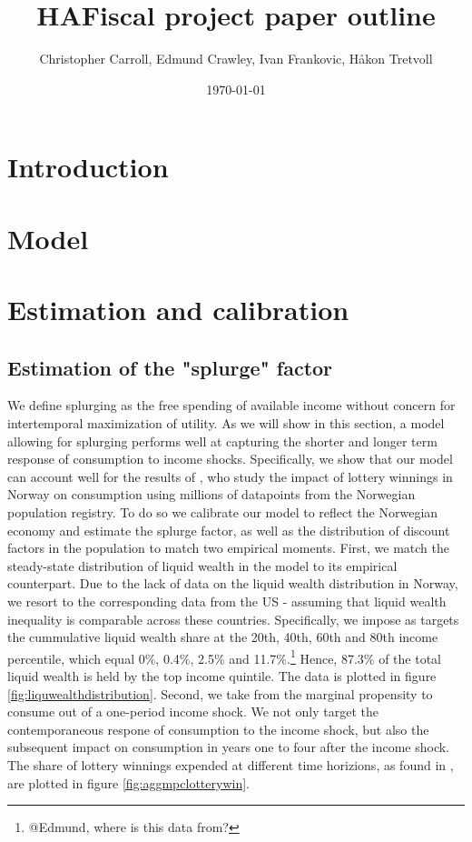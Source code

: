\documentclass[11pt]{article}
\title{ HAFiscal project paper outline}
\author{Christopher Carroll, Edmund Crawley, Ivan Frankovic, Håkon Tretvoll}
\date{\today}
\begin{document}
	\maketitle
	
	
	\section{Introduction}
	
	\section{Model}
	
	\section{Estimation and calibration}
	
	\subsection{Estimation of the "splurge" factor}
	
	We define splurging as the free spending of available income without concern for intertemporal maximization of utility. As we will show in this section, a model allowing for splurging performs well at capturing the shorter and longer term response of consumption to income shocks. Specifically, we show that our model can account well for the results of \citet{fagereng_mpc_2021}, who study the impact of lottery winnings in Norway on consumption using millions of datapoints from the Norwegian population registry. To do so we calibrate our model to reflect the Norwegian economy and estimate the splurge factor, as well as the distribution of discount factors in the population to match two empirical moments. 	
	First, we match the steady-state distribution of liquid wealth in the model to its empirical counterpart. Due to the lack of data on the liquid wealth distribution in Norway, we resort to the corresponding data from the US - assuming that liquid wealth inequality is comparable across these countries. Specifically, we impose as targets the cummulative liquid wealth share at the 20th, 40th, 60th and 80th income percentile, which equal 0\%, 0.4\%, 2.5\% and 11.7\%.\footnote{@Edmund, where is this data from?} Hence, 87.3\% of the total liquid wealth is  held by the top income quintile. The data is plotted in figure \ref{fig:liquwealthdistribution}.
	Second, we take from \citet{fagereng_mpc_2021} the marginal propensity to consume out of a one-period income shock. We not only target the contemporaneous respone of consumption to the income shock, but also the subsequent impact on consumption in years one to four after the income shock. The share of lottery winnings expended at different time horizions, as found in \citet{fagereng_mpc_2021}, are plotted in figure \ref{fig:aggmpclotterywin}.
\end{document}
